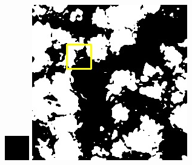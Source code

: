 \documentclass[10pt]{ctexart}
\begin{document}
\begin{multicols}{2}
\begin{figure}[H]
{\begin{minipage}[b]{0.15\linewidth}
            \includegraphics[width=1\linewidth]{../log/spoon2/cut/tmp_cut_LC81321192014054LGN00_03055_unet.jpg}\vspace{4pt}
            \includegraphics[width=1\linewidth]{../log/spoon2/cut/LC80350192014190LGN00_06561_unet.jpg}\vspace{4pt}

\end{minipage}}
\end{figure}
\end{multicols}
\end{document}
